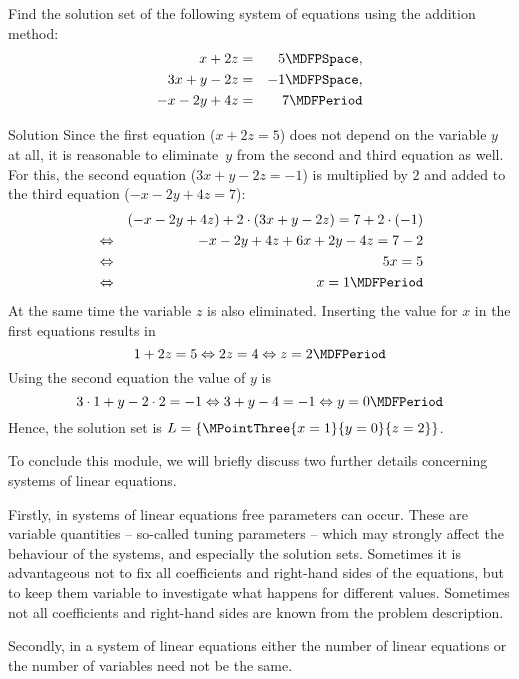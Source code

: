 \begin{MExercises}
\begin{MExercise}
Find the solution set of the following system of equations using the addition method:
\begin{eqnarray*}
x + 2 z & = & 5 \MDFPSpace, \\ 3 x + y - 2 z & = & - 1  \MDFPSpace,\\ - x - 2 y + 4 z & = & 7 \MDFPeriod
\end{eqnarray*}

\begin{MHint}{Solution}
Since the first equation ($x + 2 z = 5$) does not depend on the variable $y$ at all, it is reasonable
to eliminate~$y$ from the second and third equation as well. For this, the second equation
($3 x + y - 2 z = - 1$) is multiplied by $2$ and added to the third equation ($- x - 2 y + 4 z = 7$):
\begin{eqnarray*}
& & (- x - 2 y + 4 z) + 2 \cdot (3 x + y - 2 z) = 7 + 2 \cdot (- 1) \\
& \Leftrightarrow & - x - 2 y + 4 z + 6 x + 2 y - 4 z = 7 - 2 \\
& \Leftrightarrow & 5 x = 5 \\
& \Leftrightarrow & x = 1 \MDFPeriod
\end{eqnarray*}
At the same time the variable $z$ is also eliminated. Inserting
the value for $x$ in the first equations results in
$$1 + 2 z = 5 \Leftrightarrow 2 z = 4 \Leftrightarrow z = 2 \MDFPeriod$$
Using the second equation the value of $y$ is
$$3 \cdot 1 + y - 2 \cdot 2 = - 1 \Leftrightarrow 3 + y - 4 = - 1 \Leftrightarrow y = 0 \MDFPeriod$$
Hence, the solution set is ${\ML} = \{ \MPointThree{x = 1}{y = 0}{z = 2} \}$.
\end{MHint}
\end{MExercise}
\end{MExercises}




\begin{MIntro}

To conclude this module, we will briefly discuss two further details concerning systems of linear equations.

Firstly, in systems of linear equations free parameters can occur. These are variable 
quantities -- so-called tuning parameters -- which may strongly affect the behaviour of the systems,
and especially the solution sets. Sometimes it is advantageous not to fix all coefficients
and right-hand sides of the equations, but to keep them variable to investigate what happens for 
different values. Sometimes not all coefficients and right-hand sides are known from the 
problem description. 

Secondly, in a system of linear equations either the number of linear equations or the number of 
variables need not be the same.

\end{MIntro}

